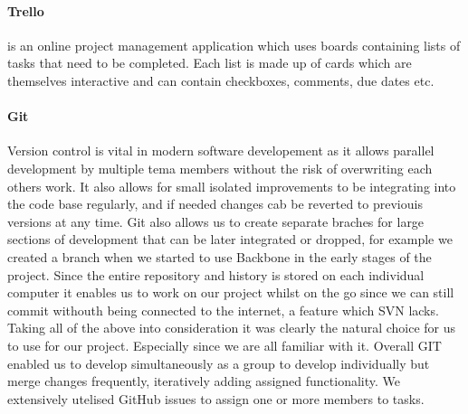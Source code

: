     \paragraph{Trello\cite{trello}} is an online project management application which uses boards containing lists of tasks that need to be completed. Each list is made up of cards which are themselves interactive and can contain checkboxes, comments, due dates etc. 

    \paragraph{Git\cite{git}} Version control is vital in modern software developement as it allows parallel development by multiple tema members without the risk of overwriting each others work. It also allows for small isolated improvements to be integrating into the code base regularly, and if needed changes cab be reverted to previouis versions at any time. Git also allows us to create separate braches for large sections of development that can be later integrated or dropped, for example we created a branch when we started to use Backbone in the early stages of the project.
    Since the entire repository and history is stored on each individual computer it enables us to work on our project whilst on the go since we can still commit withouth being connected to the internet, a feature which SVN lacks.
    Taking all of the above into consideration it was clearly the natural choice for us to use for our project. Especially since we are all familiar with it.
    Overall GIT enabled us to develop simultaneously as a group to develop individually but merge changes frequently, iteratively adding assigned functionality. We extensively utelised GitHub issues to assign one or more members to tasks.


